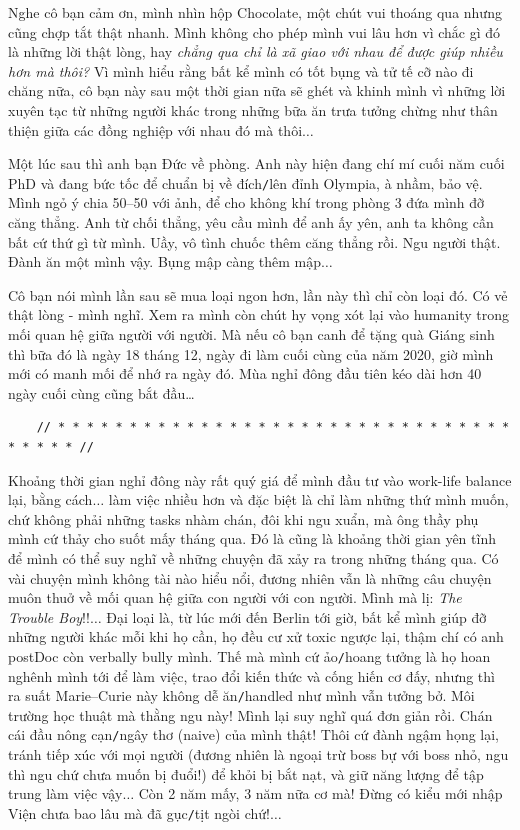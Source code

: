 \documentclass[12pt]{article}
\numberwithin{equation}{section}
\begin{document}
Nghe cô bạn cảm ơn, mình nhìn hộp Chocolate, một chút vui thoáng qua nhưng cũng chợp tắt thật nhanh. Mình không cho phép mình vui lâu hơn vì chắc gì đó là những lời thật lòng, hay \textit{chẳng qua chỉ là xã giao với nhau để được giúp nhiều hơn mà thôi?} Vì mình hiểu rằng bất kể mình có tốt bụng và tử tế cỡ nào đi chăng nữa, cô bạn này sau một thời gian nữa sẽ ghét và khinh mình vì những lời xuyên tạc từ những người khác trong những bữa ăn trưa tưởng chừng như thân thiện giữa các đồng nghiệp với nhau đó mà thôi$\ldots$

Một lúc sau thì anh bạn Đức về phòng. Anh này hiện đang chí mí cuối năm cuối PhD và đang bức tốc để chuẩn bị về đích\texttt{/}lên đỉnh Olympia, à nhầm, bảo vệ. Mình ngỏ ý chia 50--50 với ảnh, để cho không khí trong phòng 3 đứa mình đỡ căng thẳng. Anh từ chối thẳng, yêu cầu mình để anh ấy yên, anh ta không cần bất cứ thứ gì từ mình. Uầy, vô tình chuốc thêm căng thẳng rồi. Ngu người thật. Đành ăn một mình vậy. Bụng mập càng thêm mập$\ldots$

Cô bạn nói mình lần sau sẽ mua loại ngon hơn, lần này thì chỉ còn loại đó. Có vẻ thật lòng - mình nghĩ. Xem ra mình còn chút hy vọng xót lại vào humanity trong mối quan hệ giữa người với người. Mà nếu cô bạn canh để tặng quà Giáng sinh thì bữa đó là ngày 18 tháng 12, ngày đi làm cuối cùng của năm 2020, giờ mình mới có manh mối để nhớ ra ngày đó. Mùa nghỉ đông đầu tiên kéo dài hơn 40 ngày cuối cùng cũng bắt đầu\ldots

\begin{verbatim}
    // * * * * * * * * * * * * * * * * * * * * * * * * * * * * * * * * * * * * * //
\end{verbatim}

\noindent
{} Khoảng thời gian nghỉ đông này rất quý giá để mình đầu tư vào work-life balance lại, bằng cách$\ldots$ làm việc nhiều hơn và đặc biệt là chỉ làm những thứ mình muốn, chứ không phải những tasks nhàm chán, đôi khi ngu xuẩn, mà ông thầy phụ mình cứ thảy cho suốt mấy tháng qua. Đó là cũng là khoảng thời gian yên tĩnh để mình có thể suy nghĩ về những chuyện đã xảy ra trong những tháng qua. Có vài chuyện mình không tài nào hiểu nổi, đương nhiên vẫn là những câu chuyện muôn thuở về mối quan hệ giữa con người với con người. Mình mà lị: \textit{The Trouble Boy}!!$\ldots$ Đại loại là, từ lúc mới đến Berlin tới giờ, bất kể mình giúp đỡ những người khác mỗi khi họ cần, họ đều cư xử toxic ngược lại, thậm chí có anh postDoc còn verbally bully mình. Thế mà mình cứ ảo\texttt{/}hoang tưởng là họ hoan nghênh mình tới để làm việc, trao đổi kiến thức và cống hiến cơ đấy, nhưng thì ra suất Marie--Curie này không dễ ăn\texttt{/}handled như mình vẫn tưởng bở. Môi trường học thuật mà thằng ngu này! Mình lại suy nghĩ quá đơn giản rồi. Chán cái đầu nông cạn\texttt{/}ngây thơ (naive) của mình thật! Thôi cứ đành ngậm họng lại, tránh tiếp xúc với mọi người (đương nhiên là ngoại trừ boss bự với boss nhỏ, ngu thì ngu chứ chưa muốn bị đuổi!) để khỏi bị bắt nạt, và giữ năng lượng để tập trung làm việc vậy$\ldots$ Còn 2 năm mấy, 3 năm nữa cơ mà! Đừng có kiểu mới nhập Viện chưa bao lâu mà đã gục\texttt{/}tịt ngòi chứ!$\ldots$
\end{document}
